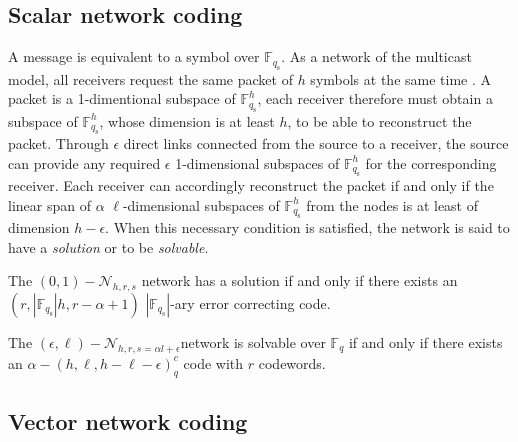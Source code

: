\subsection{Scalar network coding \label{subsec:Scalar-network-coding}}

A message is equivalent to a symbol over $\ensuremath{\mathbb{F}}_{q_{\mathrm{s}}}$.
As a network of the multicast model, all receivers request the same
packet of $h$ symbols at the same time \cite{Trautmann:2013}. A
packet is a 1-dimentional subspace of $\ensuremath{\mathbb{F}}_{q_{\mathrm{s}}}^{h}$,
each receiver therefore must obtain a subspace of $\ensuremath{\mathbb{F}}_{q_{\mathrm{s}}}^{h}$,
whose dimension is at least $h$, to be able to reconstruct the packet.
Through $\epsilon$ direct links connected from the source to a receiver,
the source can provide any required $\epsilon$ 1-dimensional subspaces
of $\ensuremath{\mathbb{F}}_{q_{\mathrm{s}}}^{h}$ for the corresponding
receiver. Each receiver can accordingly reconstruct the packet if
and only if the linear span of $\alpha$ $\ell$-dimensional subspaces
of $\ensuremath{\mathbb{F}}_{q_{\mathrm{s}}}^{h}$ from the nodes
is at least of dimension $h-\epsilon$. When this necessary condition
is satisfied, the network is said to have a \textit{solution} or to
be \textit{solvable}.
\begin{thm}
 The $(0,1)-\mathcal{N}_{h,r,s}$ network has a solution if and only
if there exists an $\left(r,\left|\ensuremath{\mathbb{F}}_{q_{\mathrm{s}}}\right|h,r-\alpha+1\right)$
$\left|\ensuremath{\mathbb{F}}_{q_{\mathrm{s}}}\right|$-ary error
correcting code. 
\end{thm}
%
\begin{thm}
 The $(\epsilon,\ell)-\mathcal{N}_{h,r,s=\alpha l+\epsilon}$network
is solvable over $\ensuremath{\mathbb{F}}_{q}$ if and only if there
exists an $\alpha-\left(h,\ell,h-\ell-\epsilon\right)_{q}^{c}$ code
with $r$ codewords. \label{theo:scalar_sol_exist}
\end{thm}

\subsection{Vector network coding \label{subsec:Vector-network-coding}}

